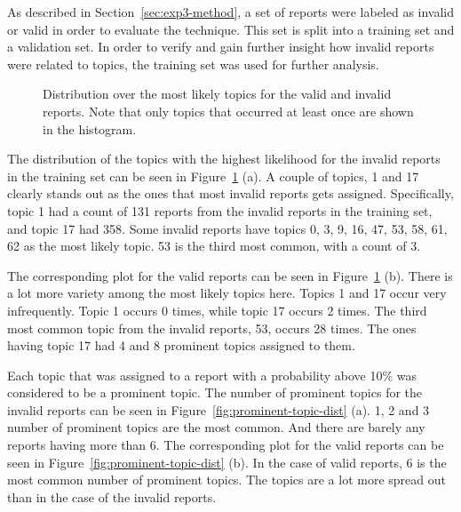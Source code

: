 As described in Section~\ref{sec:exp3-method}, a set of reports were labeled as invalid or valid in order to evaluate the technique.
This set is split into a training set and a validation set.
In order to verify and gain further insight how invalid reports were related to topics, the training set was used for further analysis.

\begin{figure}[h!]
    \centering
    \caption{Distribution over the most likely topics for the valid and invalid reports. Note that only topics that occurred at least once are shown in the histogram.}
    \label{fig:most-likely-topics}
\end{figure}

The distribution of the topics with the highest likelihood for the invalid reports in the training set can be seen in Figure~\ref{fig:most-likely-topics} (a).
A couple of topics, 1 and 17 clearly stands out as the ones that most invalid reports gets assigned.
Specifically, topic 1 had a count of 131 reports from the invalid reports in the training set, and topic 17 had 358.
Some invalid reports have topics 0, 3, 9, 16, 47, 53, 58, 61, 62 as the most likely topic.
53 is the third most common, with a count of 3.

The corresponding plot for the valid reports can be seen in Figure~\ref{fig:most-likely-topics} (b).
There is a lot more variety among the most likely topics here.
Topics 1 and 17 occur very infrequently.
Topic 1 occurs 0 times, while topic 17 occurs 2 times.
The third most common topic from the invalid reports, 53, occurs 28 times.
The ones having topic 17 had 4 and 8 prominent topics assigned to them.

Each topic that was assigned to a report with a probability above 10\% was considered to be a prominent topic.
The number of prominent topics for the invalid reports can be seen in Figure~\ref{fig:prominent-topic-dist} (a).
1, 2 and 3 number of prominent topics are the most common.
And there are barely any reports having more than 6.
The corresponding plot for the valid reports can be seen in Figure~\ref{fig:prominent-topic-dist} (b).
In the case of valid reports, 6 is the most common number of prominent topics. 
The topics are a lot more spread out than in the case of the invalid reports.

